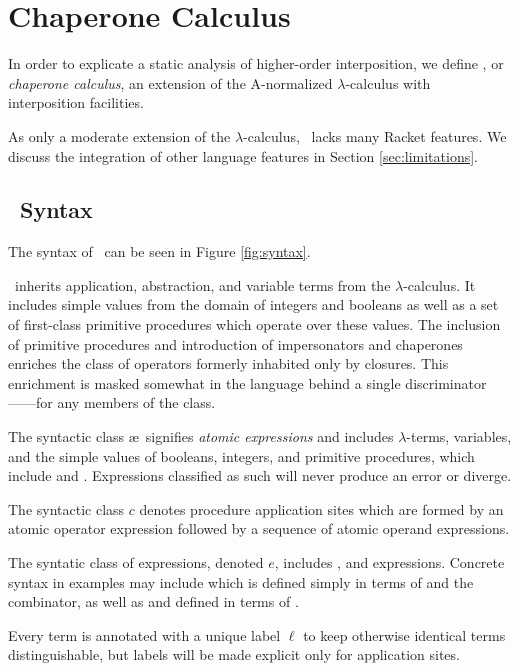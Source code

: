 \section{Chaperone Calculus}

In order to explicate a static analysis of higher-order interposition, we define \chapcalc, or \emph{chaperone calculus}, an extension of the A-normalized $\lambda$-calculus with interposition facilities.

As only a moderate extension of the $\lambda$-calculus, \chapcalc\ lacks many Racket features.
We discuss the integration of other language features in Section \ref{sec:limitations}.


\subsection{\chapcalc\ Syntax}

The syntax of \chapcalc\ can be seen in Figure \ref{fig:syntax}.

\chapcalc\ inherits application, abstraction, and variable terms from the $\lambda$-calculus.
It includes simple values from the domain of integers and booleans as well as a set of first-class primitive procedures which operate over these values.
The inclusion of primitive procedures and introduction of impersonators and chaperones enriches the class of operators formerly inhabited only by closures.
This enrichment is masked somewhat in the language behind a single discriminator------for any members of the class.

The syntactic class \ae\ signifies \emph{atomic expressions} and includes $\lambda$-terms, variables, and the simple values of booleans, integers, and primitive procedures, which include  and .
Expressions classified as such will never produce an error or diverge.

The syntactic class $c$ denotes procedure application sites which are formed by an atomic operator expression followed by a sequence of atomic operand expressions.

The syntatic class of expressions, denoted $e$, includes , and  expressions.
Concrete syntax in examples may include  which is defined simply in terms of  and the  combinator, as well as  and  defined in terms of .

Every term is annotated with a unique label $\ell$ to keep otherwise identical terms distinguishable, but labels will be made explicit only for application sites.

